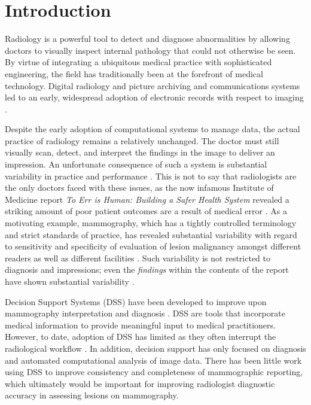 \chapter{Introduction}
Radiology is a powerful tool to detect and diagnose abnormalities by allowing doctors to visually inspect internal pathology that could not otherwise be seen. By virtue of integrating a ubiquitous medical practice with sophisticated engineering, the field has traditionally been at the forefront of medical technology. Digital radiology and picture archiving and communications systems led to an early, widespread adoption of electronic records with respect to imaging \cite{Strickland:2000cv,Bryan:1999kn}.

Despite the early adoption of computational systems to manage data, the actual practice of radiology remains a relatively unchanged. The doctor must still visually scan, detect, and interpret the findings in the image to deliver an impression. An unfortunate consequence of such a system is substantial variability in practice and performance \cite{Robinson:1997uq,Fitzgerald:2001hn}. This is not to say that radiologists are the only doctors faced with these issues, as the now infamous Institute of Medicine report \emph{To Err is Human: Building a Safer Health System} revealed a striking amount of poor patient outcomes are a result of medical error \cite{Anonymous:2000va}. As a motivating example, mammography, which has a tightly controlled terminology and strict standards of practice, has revealed substantial variability with regard to sensitivity and specificity of evaluation of lesion malignancy amongst different readers as well as different facilities \cite{Jackson:2009fw, Beam:1996ui, Elmore:2002vc, Taplin:2008bv}. Such variability is not restricted to diagnosis and impressions; even the \emph{findings} within the contents of the report have shown substantial variability \cite{Hobby:2000th, Robinson:1997uq}.

Decision Support Systems (DSS) have been developed to improve upon mammography interpretation and diagnosis \cite{Garg:2005cb, Burnside:2000wl, ElizabethS:2005gc, Rubin:2005jg}. DSS are tools that incorporate medical information to provide meaningful input to medical practitioners. However, to date, adoption of DSS has limited as they often interrupt the radiological workflow \cite{Morgan:2011ct}. In addition, decision support has only focused on diagnosis and automated computational analysis of image data. There has been little work using DSS to improve consistency and completeness of mammographic reporting, which ultimately would be important for improving radiologist diagnostic accuracy in assessing lesions on mammography.

